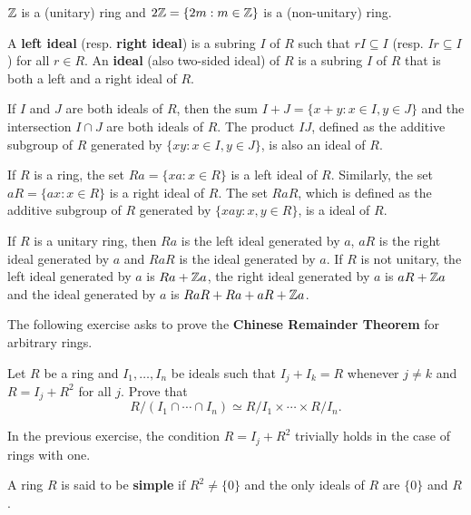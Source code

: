 \begin{example}
    $\mathbb{Z}$ is a (unitary) ring and 
	$2\mathbb{Z}=\{2m:m\in\mathbb{Z}\}$ is a (non-unitary) ring.  
\end{example}

A \textbf{left ideal} (resp. \textbf{right ideal}) is a subring $I$ of $R$ such that 
$rI\subseteq I$ (resp. $Ir\subseteq I$) for all $r\in R$. An \textbf{ideal}
(also two-sided ideal) of $R$ is a subring $I$ of $R$ that is both a left and a right ideal of $R$.

\begin{example}
	If $I$ and $J$ are both ideals of $R$, then the sum $I+J=\{x+y:x\in I,y\in J\}$ and
	the intersection $I\cap J$ are both ideals of $R$. The product $IJ$, defined as the additive
	subgroup of $R$ generated by $\{xy:x\in I,y\in J\}$, is also an ideal of $R$. 
\end{example}

\begin{example}
	If $R$ is a ring, the set $Ra =\{xa: x\in R\}$ is a left ideal
	of $R$. Similarly, the set $aR =\{ax: x\in R\}$ is a right ideal of $R$. The set $RaR$, which is
	defined as the additive subgroup of $R$ generated by $\{xay: x, y\in R\}$, is a
	ideal of $R$.
\end{example}

\begin{example}
	If $R$ is a unitary ring, then $Ra$ is the left ideal generated by $a$, $aR$ is
	the right ideal generated by $a$ and $RaR$ is the ideal generated by $a$. 
	If $R$ is not unitary, the left ideal generated by $a$ is $Ra+\mathbb{Z} a$,
	the right ideal generated by $a$ is $aR+\mathbb{Z} a$ and the ideal generated by 
	$a$ is $RaR+Ra+aR+\mathbb{Z} a$.
\end{example}

The following exercise asks to prove the \textbf{Chinese Remainder Theorem}  
for arbitrary rings.

\begin{exercise}
    \label{xca:chinese}
    Let $R$ be a ring and $I_1,\dots,I_n$ be ideals such that 
    $I_j+I_k=R$ whenever $j\ne k$ and $R=I_j+R^2$ for all $j$. Prove that 
    \[
    R/(I_1\cap\cdots\cap I_n)\simeq R/I_1\times\cdots\times R/I_n.
    \]
\end{exercise}

In the previous exercise, the condition $R=I_j+R^2$ trivially holds in the case of rings with one. 

\begin{definition}
A ring $R$ is said to be \textbf{simple} if $R^2\ne\{0\}$ and the only ideals of 
$R$ are $\{0\}$ and $R$.  
\end{definition}

